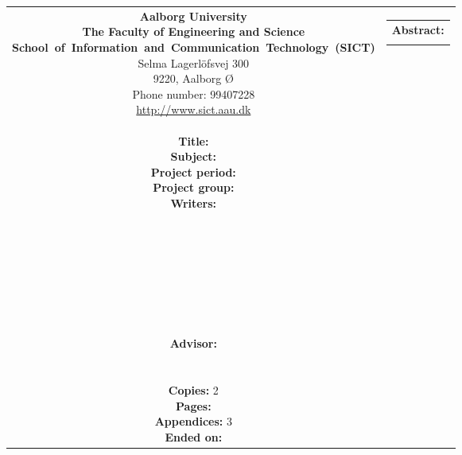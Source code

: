 \thispagestyle{empty}
{\samepage 
\begin{tabular}{cc}
	\parbox{7cm}{
	{\sf\noindent
	\textbf{Aalborg University}\\
	\textbf{The Faculty of Engineering and Science}\\
	\mbox{\textbf{School of Information and Communication Technology (SICT)}}\\
	Selma Lagerlöfsvej 300\\
	9220, Aalborg Ø\\
	Phone number: 99407228\\
	\url{http://www.sict.aau.dk}} \\\\
	{\bf Title:} \TITLE\\
	{\bf Subject:} \SUBJECT\\
	{\bf Project period:} \PERIOD\\
	{\bf Project group:} \GROUPNUMBER\\
	{\bf Writers:}\\[0.7cm]
      		\underline{\phantom{\TPNAMESPACE}}\\
      		\NAMEONE \\[0.7cm]
      		\underline{\phantom{\TPNAMESPACE}}\\
      		\NAMETWO \\[0.7cm]
      		\underline{\phantom{\TPNAMESPACE}}\\
      		\NAMETHREE \\[0.7cm]
      		\underline{\phantom{\TPNAMESPACE}}\\
      		\NAMEFOUR \\[0.7cm]
	{\bf Advisor:} \\
	\SUPERVISOR \\\\
	{\bf Copies:} 2\\
	{\bf Pages:} \pageref{LastPage}\\
	{\bf Appendices:} 3\\
	{\bf Ended on:} \ENDDATE
	\vfill} &
	\parbox{7cm}{
	\vspace{.15cm}
	\hfill 
	\begin{tabular}{l}
		{\bf Abstract:}\bigskip \\
		\fbox{
		\parbox{6cm}{\bigskip
		{\vfill{\small 
		\bigskip}}
		}\hspace{0.2em}}
	\end{tabular}}
\end{tabular}\vfill
{}
}